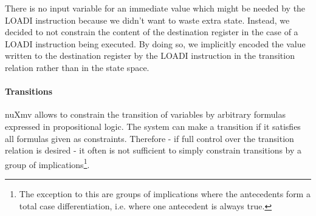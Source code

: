 There is no input variable for an immediate value which might be needed by the LOADI instruction because we didn't want to waste extra state.
Instead, we decided to not constrain the content of the destination register in the case of a LOADI instruction being executed.
By doing so, we implicitly encoded the value written to the destination register by the LOADI instruction in the transition relation rather than in the state space.

\paragraph{Transitions}
nuXmv allows to constrain the transition of variables by arbitrary formulas expressed in propositional logic.
The system can make a transition if it satisfies all formulas given as constraints.
Therefore - if full control over the transition relation is desired - it often is not sufficient to simply constrain transitions by a group of implications\footnote{%
    The exception to this are groups of implications where the antecedents form a total case differentiation, i.e. where one antecedent is always true.
}.

